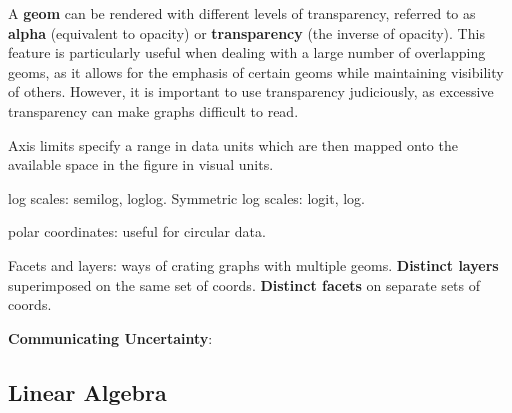 \documentclass{article}
\begin{document}
\noindent A \textbf{geom} can be rendered with different levels of transparency,
referred to as \textbf{alpha} (equivalent to opacity) or
\textbf{transparency} (the inverse of opacity).
This feature is particularly useful when dealing with a large number
of overlapping geoms, as it allows for the emphasis of certain geoms
while maintaining visibility of others.
However, it is important to use transparency judiciously, as excessive
transparency can make graphs difficult to read.

\noindent Axis limits specify a range in data units which are then mapped onto the available space in the figure in visual units.

\noindent log scales: semilog, loglog. Symmetric log scales: logit, log.

\noindent polar coordinates: useful for circular data.

\noindent Facets and layers: ways of crating graphs with multiple geoms.
\textbf{Distinct layers} superimposed on the same set of coords.
\textbf{Distinct facets} on separate sets of coords.

\noindent \textbf{Communicating Uncertainty}:








\subsection*{Linear Algebra}
\end{document}

